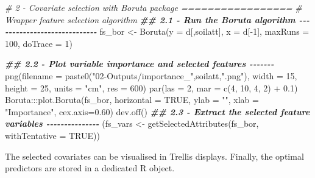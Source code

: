 \documentclass[
  10pt,
  b5paper,
  oneside]{book}
\newenvironment{Shaded}{\begin{snugshade}}{\end{snugshade}}
\newcommand{\AttributeTok}[1]{\textcolor[rgb]{0.77,0.63,0.00}{#1}}
\newcommand{\CommentTok}[1]{\textcolor[rgb]{0.56,0.35,0.01}{\textit{#1}}}
\newcommand{\ConstantTok}[1]{\textcolor[rgb]{0.00,0.00,0.00}{#1}}
\newcommand{\DecValTok}[1]{\textcolor[rgb]{0.00,0.00,0.81}{#1}}
\newcommand{\DocumentationTok}[1]{\textcolor[rgb]{0.56,0.35,0.01}{\textbf{\textit{#1}}}}
\newcommand{\FloatTok}[1]{\textcolor[rgb]{0.00,0.00,0.81}{#1}}
\newcommand{\FunctionTok}[1]{\textcolor[rgb]{0.00,0.00,0.00}{#1}}
\newcommand{\NormalTok}[1]{#1}
\newcommand{\OtherTok}[1]{\textcolor[rgb]{0.56,0.35,0.01}{#1}}
\newcommand{\SpecialCharTok}[1]{\textcolor[rgb]{0.00,0.00,0.00}{#1}}
\newcommand{\StringTok}[1]{\textcolor[rgb]{0.31,0.60,0.02}{#1}}
\begin{document}
\begin{Shaded}
\begin{Highlighting}[]
  \CommentTok{\# 2 {-} Covariate selection with Boruta package =================}
  \CommentTok{\# Wrapper feature selection algorithm}
  \DocumentationTok{\#\# 2.1 {-} Run the Boruta algorithm {-}{-}{-}{-}{-}{-}{-}{-}{-}{-}{-}{-}{-}{-}{-}{-}{-}{-}{-}{-}{-}{-}{-}{-}{-}{-}{-}{-}{-}}
\NormalTok{  fs\_bor }\OtherTok{\textless{}{-}}
  \FunctionTok{Boruta}\NormalTok{(}\AttributeTok{y =}\NormalTok{ d[,soilatt], }\AttributeTok{x =}\NormalTok{ d[}\SpecialCharTok{{-}}\DecValTok{1}\NormalTok{], }\AttributeTok{maxRuns =} \DecValTok{100}\NormalTok{, }\AttributeTok{doTrace =} \DecValTok{1}\NormalTok{)}
  
  \DocumentationTok{\#\# 2.2 {-} Plot variable importance and selected features {-}{-}{-}{-}{-}{-}{-}}
  \FunctionTok{png}\NormalTok{(}\AttributeTok{filename =} \FunctionTok{paste0}\NormalTok{(}\StringTok{"02{-}Outputs/importance\_"}\NormalTok{,soilatt,}\StringTok{".png"}\NormalTok{), }
       \AttributeTok{width =} \DecValTok{15}\NormalTok{, }\AttributeTok{height =} \DecValTok{25}\NormalTok{, }\AttributeTok{units =} \StringTok{"cm"}\NormalTok{, }\AttributeTok{res =} \DecValTok{600}\NormalTok{)}
  \FunctionTok{par}\NormalTok{(}\AttributeTok{las =} \DecValTok{2}\NormalTok{, }\AttributeTok{mar =} \FunctionTok{c}\NormalTok{(}\DecValTok{4}\NormalTok{, }\DecValTok{10}\NormalTok{, }\DecValTok{4}\NormalTok{, }\DecValTok{2}\NormalTok{) }\SpecialCharTok{+} \FloatTok{0.1}\NormalTok{)}
\NormalTok{  Boruta}\SpecialCharTok{:::}\FunctionTok{plot.Boruta}\NormalTok{(fs\_bor, }\AttributeTok{horizontal =} \ConstantTok{TRUE}\NormalTok{, }\AttributeTok{ylab =} \StringTok{""}\NormalTok{,}
                       \AttributeTok{xlab =} \StringTok{"Importance"}\NormalTok{, }\AttributeTok{cex.axis=}\FloatTok{0.60}\NormalTok{)}
  \FunctionTok{dev.off}\NormalTok{()}
  \DocumentationTok{\#\# 2.3 {-} Extract the selected feature variables {-}{-}{-}{-}{-}{-}{-}{-}{-}{-}{-}{-}{-}{-}{-}}
\NormalTok{  (fs\_vars }\OtherTok{\textless{}{-}} 
     \FunctionTok{getSelectedAttributes}\NormalTok{(fs\_bor, }\AttributeTok{withTentative =} \ConstantTok{TRUE}\NormalTok{))}
\end{Highlighting}
\end{Shaded}

The selected covariates can be visualised in Trellis displays. Finally, the optimal predictors are stored in a dedicated R object.
\end{document}
